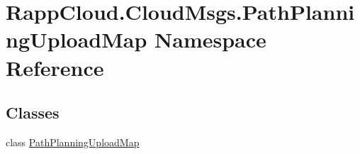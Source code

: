 \hypertarget{namespaceRappCloud_1_1CloudMsgs_1_1PathPlanningUploadMap}{\section{Rapp\-Cloud.\-Cloud\-Msgs.\-Path\-Planning\-Upload\-Map Namespace Reference}
\label{namespaceRappCloud_1_1CloudMsgs_1_1PathPlanningUploadMap}
}
\subsection*{Classes}
\begin{DoxyCompactItemize}
\item 
class \hyperlink{classRappCloud_1_1CloudMsgs_1_1PathPlanningUploadMap_1_1PathPlanningUploadMap}{Path\-Planning\-Upload\-Map}
\end{DoxyCompactItemize}
